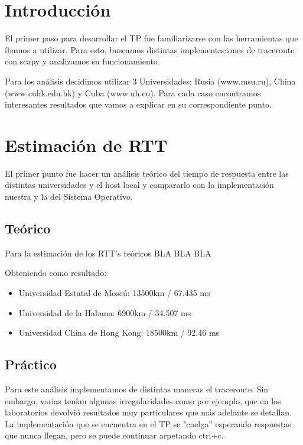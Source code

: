 \documentclass[%
	final,
	narroweqnarray,
	inline,
	twoside,
	]{ieee}
\begin{document}
\section{Introducción}
El primer paso para desarrollar el TP fue familiarizarse con las herramientas que íbamos a utilizar. Para esto, buscamos distintas implementaciones de traceroute con scapy y analizamos su funcionamiento.

Para los análisis decidimos utilizar 3 Universidades: Rusia (www.msu.ru), China (www.cuhk.edu.hk) y Cuba (www.uh.cu). Para cada caso encontramos interesantes resultados que vamos a explicar en su correspondiente punto.


\section{Estimación de RTT}
El primer punto fue hacer un análisis teórico del tiempo de respuesta entre las distintas universidades y el host local y compararlo con la implementación nuestra y la del Sistema Operativo.
\subsection{Teórico}
Para la estimación de los RTT's teóricos BLA BLA BLA

Obteniendo como resultado: 
\begin{itemize}
\item Universidad Estatal de Moscú: 13500km / 67.435 ms \\
\item Universidad de la Habana: 6900km / 34.507 ms \\
\item Universidad China de Hong Kong: 18500km / 92.46 ms \\
\end{itemize}
\subsection{Práctico}
Para este análisis implementamos de distintas maneras el traceroute. Sin embargo, varias tenían algunas irregularidades como por ejemplo, que en los laboratorios devolvió resultados muy particulares que más adelante se detallan. La implementación que se encuentra en el TP se "cuelga'' esperando respuestas que nunca llegan, pero se puede continuar arpetando ctrl+c. 
\end{document}
